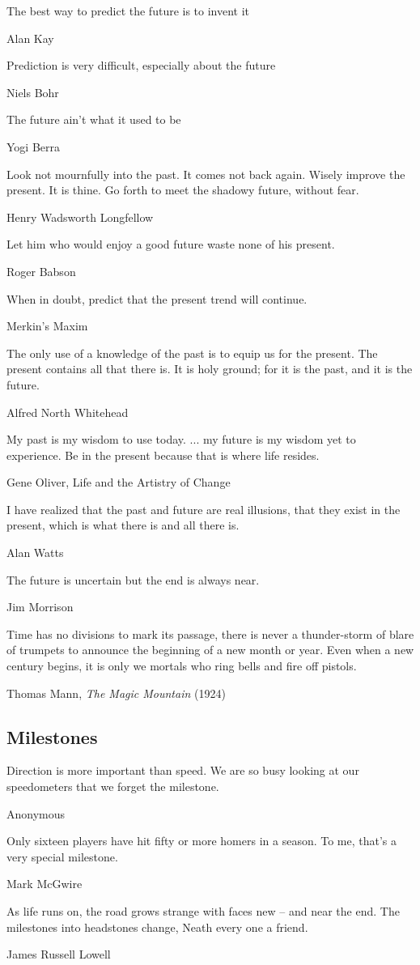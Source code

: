 \epigraph{The best way to predict the future is to invent it}{Alan Kay}

\epigraph{Prediction is very difficult, especially about the future}{Niels Bohr}

\epigraph{The future ain't what it used to be}{Yogi Berra}

\epigraph{Look not mournfully into the past. It comes not back again.  Wisely improve the present. It is thine. Go forth to meet the shadowy future, without fear.}{Henry Wadsworth Longfellow} %

\epigraph{Let him who would enjoy a good future waste none of his present.}{Roger Babson}

\epigraph{When in doubt, predict that the present trend will continue.}{Merkin's Maxim}

\epigraph{The only use of a knowledge of the past is to equip us for the present. The present contains all that there is. It is holy ground; for it is the past, and it is the future.}{Alfred North Whitehead} %

\epigraph{My past is my wisdom to use today. ... my future is my wisdom yet to experience. Be in the present because that is where life resides.}{Gene Oliver, Life and the Artistry of Change}

\epigraph{I have realized that the past and future are real illusions, that they exist in the present, which is what there is and all there is.}{Alan Watts}

\epigraph{The future is uncertain but the end is always near.}{Jim Morrison}

\epigraph{Time has no divisions to mark its passage, there is never a thunder-storm of blare of trumpets to announce the beginning of a new month or year. Even when a new century begins, it is only we mortals who ring bells and fire off pistols.}{Thomas Mann, \emph{The Magic Mountain} (1924)}

\subsection{Milestones}

\epigraph{Direction is more important than speed. We are so busy looking at our speedometers that we forget the milestone.}{Anonymous}

\epigraph{Only sixteen players have hit fifty or more homers in a season. To me, that's a very special milestone.}{Mark McGwire}

\epigraph{As life runs on, the road grows strange with faces new -- and near the end. The milestones into headstones change, Neath every one a friend.}{James Russell Lowell}

